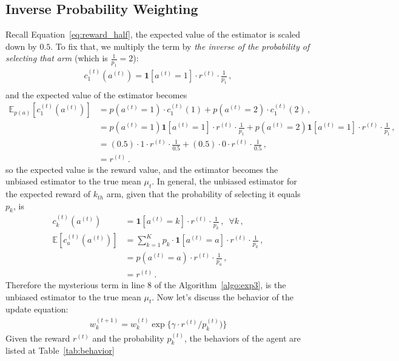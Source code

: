 \documentclass[11pt]{article}
\begin{document}
\subsection{Inverse Probability Weighting}
Recall Equation~\ref{eq:reward_half}, the expected value of the estimator is scaled down by $0.5$. To fix that, we multiply the term by \textit{the inverse of the probability of selecting that arm} (which is $\frac{1}{p_1} = 2$):
\begin{align*}
    c_1^{(t)}(a^{(t)}) = \mathbf{1}[a^{(t)}=1] \cdot r^{(t)} \cdot \frac{1}{p_1}\, , \\
\end{align*}
and the expected value of the estimator becomes
\begin{align*}
    \mathbb{E}_{p(a)} \left[ c_1^{(t)} (a^{(t)})\right] &= p(a^{(t)} = 1) \cdot c_1^{(t)} (1) + p(a^{(t)} = 2) \cdot c_1^{(t)} (2)\, , \\
    &= p(a^{(t)} = 1) \mathbf{1}[a^{(t)} = 1] \cdot r^{(t)} \cdot \frac{1}{p_1} + p(a^{(t)} = 2) \mathbf{1}[a^{(t)} = 1] \cdot r^{(t)} \cdot \frac{1}{p_1}\, , \\
    &= (0.5) \cdot 1 \cdot r^{(t)} \cdot \frac{1}{0.5} + (0.5) \cdot 0 \cdot r^{(t)} \cdot \frac{1}{0.5}\, , \\
    &= r^{(t)}\, .
\end{align*}
so the expected value is the reward value, and the estimator becomes the unbiased estimator to the true mean $\mu_t$. In general, the unbiased estimator for the expected reward of $k_{th}$ arm, given that the probability of selecting it equals $p_k$, is
\begin{align*}
    c_k^{(t)}(a^{(t)}) &= \mathbf{1}[a^{(t)}=k] \cdot r^{(t)} \cdot \frac{1}{p_k}\, , \,\,\, \forall k\, , \\
    \mathbb{E}\left[ c_a^{(t)} (a^{(t)}) \right] &= \sum_{k=1}^{K} p_k \cdot \mathbf{1} [a^{(t)} = a] \cdot r^{(t)} \cdot \frac{1}{p_k}\, , \\
    &= p(a^{(t)} = a) \cdot r^{(t)} \cdot \frac{1}{p_a}\, , \\
    &= r^{(t)}\, .
\end{align*}
Therefore the mysterious term in line 8 of the Algorithm~\ref{algo:exp3}, is the unbiased estimator to the true mean $\mu_t$. Now let's discuss the behavior of the update equation:
\begin{align*}
    w_k^{(t+1)} = w_k^{(t)} \exp{\{\gamma \cdot r^{(t)}/p_k^{(t)} )\}}
\end{align*}
Given the reward $r^{(t)}$ and the probability $p_k^{(t)}$, the behaviors of the agent are listed at Table~\ref{tab:behavior}
\end{document}
